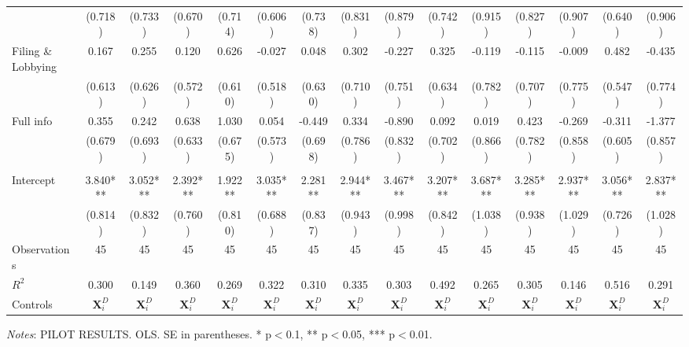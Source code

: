 \documentclass[11pt]{article}
\begin{document}
\begin{landscape}
\begin{table}[!htbp]
\begin{threeparttable}
\begin{tabular}{l||cc|cc|cc|cc|cc||cc||cc}
 & (0.718) & (0.733) & (0.670) & (0.714) & (0.606) & (0.738) & (0.831) & (0.879) & (0.742) & (0.915) & (0.827) & (0.907) & (0.640) & (0.906) \\
Filing \& Lobbying & 0.167 & 0.255 & 0.120 & 0.626 & -0.027 & 0.048 & 0.302 & -0.227 & 0.325 & -0.119 & -0.115 & -0.009 & 0.482 & -0.435 \\
 & (0.613) & (0.626) & (0.572) & (0.610) & (0.518) & (0.630) & (0.710) & (0.751) & (0.634) & (0.782) & (0.707) & (0.775) & (0.547) & (0.774) \\
Full info & 0.355 & 0.242 & 0.638 & 1.030 & 0.054 & -0.449 & 0.334 & -0.890 & 0.092 & 0.019 & 0.423 & -0.269 & -0.311 & -1.377 \\
 & (0.679) & (0.693) & (0.633) & (0.675) & (0.573) & (0.698) & (0.786) & (0.832) & (0.702) & (0.866) & (0.782) & (0.858) & (0.605) & (0.857) \\
\\[0.5em]
Intercept & 3.840*** & 3.052*** & 2.392*** & 1.922** & 3.035*** & 2.281** & 2.944*** & 3.467*** & 3.207*** & 3.687*** & 3.285*** & 2.937*** & 3.056*** & 2.837*** \\
 & (0.814) & (0.832) & (0.760) & (0.810) & (0.688) & (0.837) & (0.943) & (0.998) & (0.842) & (1.038) & (0.938) & (1.029) & (0.726) & (1.028) \\
\midrule
Observations & 45 & 45 & 45 & 45 & 45 & 45 & 45 & 45 & 45 & 45 & 45 & 45 & 45 & 45 \\
$R^2$ & 0.300 & 0.149 & 0.360 & 0.269 & 0.322 & 0.310 & 0.335 & 0.303 & 0.492 & 0.265 & 0.305 & 0.146 & 0.516 & 0.291 \\
Controls & $\mathbf{X}_{i}^{D}$ & $\mathbf{X}_{i}^{D}$ & $\mathbf{X}_{i}^{D}$ & $\mathbf{X}_{i}^{D}$ & $\mathbf{X}_{i}^{D}$ & $\mathbf{X}_{i}^{D}$ & $\mathbf{X}_{i}^{D}$ & $\mathbf{X}_{i}^{D}$ & $\mathbf{X}_{i}^{D}$ & $\mathbf{X}_{i}^{D}$ & $\mathbf{X}_{i}^{D}$ & $\mathbf{X}_{i}^{D}$ & $\mathbf{X}_{i}^{D}$ & $\mathbf{X}_{i}^{D}$ \\
\bottomrule
\end{tabular}
\begin{tablenotes}[flushleft]
\footnotesize
\item \textit{Notes}: PILOT RESULTS. OLS. SE in parentheses. * p$<$0.1, ** p$<$0.05, *** p$<$0.01.
\end{tablenotes}
\end{threeparttable}
\end{table}
\end{landscape}
\FloatBarrier
\end{document}
